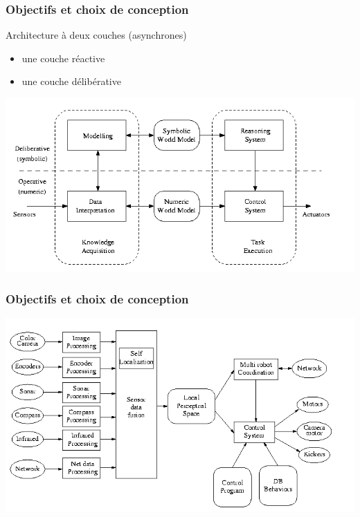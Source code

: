 \documentclass{beamer}
\begin{document}
\begin{frame}
\frametitle{Objectifs et choix de conception}
Architecture à deux couches (asynchrones)
\begin{itemize}
	\item une couche réactive
	\item une couche délibérative
\end{itemize}
\begin{center}
    \includegraphics[width=.90\linewidth]{images/art}
\end{center}
\end{frame}


\begin{frame}
\frametitle{Objectifs et choix de conception}
\begin{center}
    \includegraphics[width=.90\linewidth]{images/art_sw}
\end{center}
\end{frame}
\end{document}
